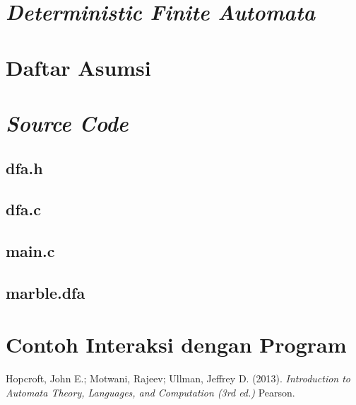 \documentclass[a4paper,titlepage]{article}
\begin{document}
	\section{\textit{Deterministic Finite Automata}}

	\section{Daftar Asumsi}

	\section{\textit{Source Code}}

		\subsection{dfa.h}
			

		\subsection{dfa.c}
			

		\subsection{main.c}
			

		\subsection{marble.dfa}
			

	\section{Contoh Interaksi dengan Program}

	\begin{thebibliography}{9}

		Hopcroft, John E.; Motwani, Rajeev; Ullman, Jeffrey D.
		(2013).
		\textit{Introduction to Automata Theory, Languages, and Computation (3rd ed.)}
		Pearson.

	\end{thebibliography}
\end{document}
